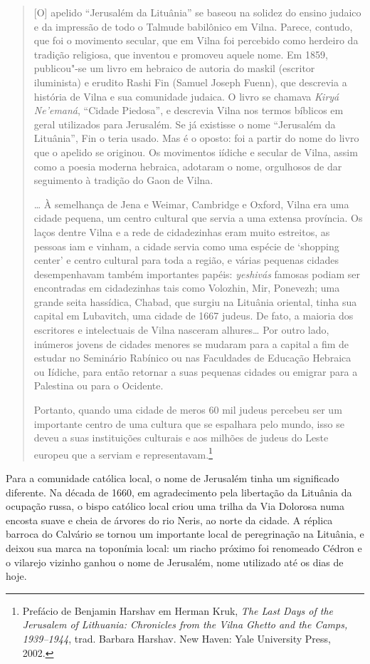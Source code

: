 \begin{quote}
{[}O{]} apelido ``Jerusalém da Lituânia'' se baseou na solidez do ensino
judaico e da impressão de todo o Talmude babilônico em Vilna. Parece,
contudo, que foi o movimento secular, que em Vilna foi percebido como
herdeiro da tradição religiosa, que inventou e promoveu aquele nome. Em
1859, publicou"-se um livro em hebraico de autoria do maskil (escritor
iluminista) e erudito Rashi Fin (Samuel Joseph Fuenn), que descrevia a
história de Vilna e sua comunidade judaica. O livro se chamava \textit{Kiryá
Ne'emaná}, ``Cidade Piedosa'', e descrevia Vilna nos termos bíblicos em
geral utilizados para Jerusalém. Se já existisse o nome ``Jerusalém da
Lituânia'', Fin o teria usado. Mas é o oposto: foi a partir do nome do
livro que o apelido se originou. Os movimentos iídiche e secular de
Vilna, assim como a poesia moderna hebraica, adotaram o nome, orgulhosos
de dar seguimento à tradição do Gaon de Vilna.

\ldots{} À semelhança de Jena e Weimar, Cambridge e Oxford, Vilna era
uma cidade pequena, um centro cultural que servia a uma extensa
província. Os laços dentre Vilna e a rede de cidadezinhas eram muito
estreitos, as pessoas iam e vinham, a cidade servia como uma espécie de
`shopping center' e centro cultural para toda a região, e várias
pequenas cidades desempenhavam também importantes papéis: \textit{yeshivás}
famosas podiam ser encontradas em cidadezinhas tais como Volozhin, Mir,
Ponevezh; uma grande seita hassídica, Chabad, que surgiu na Lituânia
oriental, tinha sua capital em Lubavitch, uma cidade de 1667 judeus. De
fato, a maioria dos escritores e intelectuais de Vilna nasceram
alhures\ldots{} Por outro lado, inúmeros jovens de cidades menores se
mudaram para a capital a fim de estudar no Seminário Rabínico ou nas
Faculdades de Educação Hebraica ou Iídiche, para então retornar a suas
pequenas cidades ou emigrar para a Palestina ou para o Ocidente.

Portanto, quando uma cidade de meros 60 mil judeus percebeu ser um
importante centro de uma cultura que se espalhara pelo mundo, isso se
deveu a suas instituições culturais e aos milhões de judeus do Leste
europeu que a serviam e representavam.\footnote{Prefácio de Benjamin Harshav em Herman Kruk, \textit{The Last Days of the Jerusalem of Lithuania: Chronicles from the Vilna Ghetto and the Camps, 1939--1944}, trad. Barbara Harshav. New Haven: Yale University Press, 2002.} 
\end{quote}

Para a comunidade católica local, o nome de Jerusalém tinha um
significado diferente. Na década de 1660, em agradecimento pela
libertação da Lituânia da ocupação russa, o bispo católico local criou
uma trilha da Via Dolorosa numa encosta suave e cheia de árvores do rio
Neris, ao norte da cidade. A réplica barroca do Calvário se tornou um
importante local de peregrinação na Lituânia, e deixou sua marca na
toponímia local: um riacho próximo foi renomeado Cédron e o vilarejo
vizinho ganhou o nome de Jerusalém, nome utilizado até os dias de hoje.


